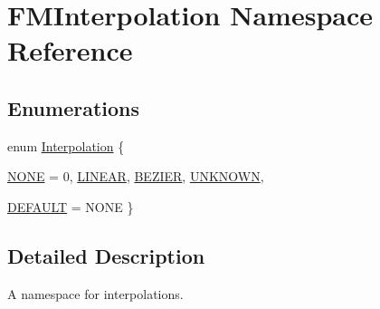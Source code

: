 \hypertarget{namespaceFMInterpolation}{
\section{FMInterpolation Namespace Reference}
\label{namespaceFMInterpolation}
}
\subsection*{Enumerations}
\begin{DoxyCompactItemize}
\item 
enum \hyperlink{namespaceFMInterpolation_afe8916659987ea9cf18951bc5a3ef574}{Interpolation} \{ \par
\hyperlink{namespaceFMInterpolation_afe8916659987ea9cf18951bc5a3ef574a9e271c68b0c77d4319f9735c2a15078a}{NONE} =  0, 
\hyperlink{namespaceFMInterpolation_afe8916659987ea9cf18951bc5a3ef574a5c836ca4b0b89b6072da3526393d561c}{LINEAR}, 
\hyperlink{namespaceFMInterpolation_afe8916659987ea9cf18951bc5a3ef574a684294fc4a30dbb28f490752a2e3c057}{BEZIER}, 
\hyperlink{namespaceFMInterpolation_afe8916659987ea9cf18951bc5a3ef574a80fbd3c6714aefd4d33b734f0258b6b2}{UNKNOWN}, 
\par
\hyperlink{namespaceFMInterpolation_afe8916659987ea9cf18951bc5a3ef574a4782e8db793e9b6dfda9435728864c0b}{DEFAULT} =  NONE
 \}
\end{DoxyCompactItemize}


\subsection{Detailed Description}
A namespace for interpolations. 

